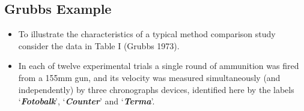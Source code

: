 \documentclass[compress]{beamer}        %
\begin{document}
\subsection{Grubbs Example}
\begin{frame}
\large
\vspace{-1cm}
\begin{itemize}
\item To illustrate the characteristics of a typical method comparison
study consider the data in Table I  (Grubbs 1973). 
\item 


In each of
twelve experimental trials a single round of ammunition was fired
from a 155mm gun, and its velocity was measured simultaneously
(and independently) by three chronographs devices, identified here
by the labels `\textbf{\textit{Fotobalk}}', `\textbf{\textit{Counter}}' and `\textbf{\textit{Terma}}'.
\end{itemize}
\end{frame}
\end{document}
